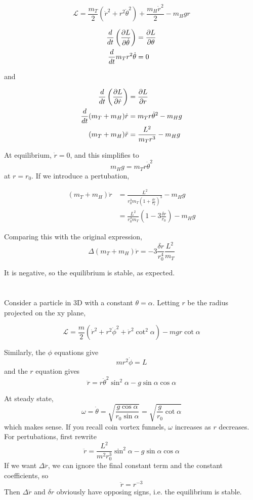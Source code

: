 \documentclass[12pt]{article}
\begin{document}
$$\mathcal L = \frac{m_T}{2}(\dot r^2 + r^2\dot\theta^2) + \frac{m_H\dot r^2}{2} - m_Hgr$$

\begin{align*}
    \frac{d}{dt}\left(\frac{\partial L}{\partial \dot\theta}\right) &= \frac{\partial L}{\partial \theta} \\
    \frac{d}{dt} m_Tr^2\dot\theta &= 0
\end{align*}

and

\begin{align*}
    \frac{d}{dt}\left(\frac{\partial L}{\partial \dot r}\right) &= \frac{\partial L}{\partial r} \\
    \frac{d}{dt} (m_T + m_H)\dot r &= m_Tr\dot\theta^2 - m_Hg \\
    (m_T + m_H)\ddot r &= \frac{L^2}{m_Tr^3} - m_Hg
\end{align*}

At equilibrium, $\dot r = 0$, and this simplifies to
$$m_Hg = m_Tr\dot\theta^2$$
at $r = r_0$. If we introduce a pertubation,

\begin{align*}
    (m_T + m_H)\ddot r &= \frac{L^2}{r_0^3m_T\left(1 + \frac{\delta r}{r_0}\right)^3} - m_Hg \\
                       &= \frac{L^2}{r_0^3m_T} \left(1 - 3\frac{\delta r}{r_0}\right) - m_Hg
\end{align*}

Comparing this with the original expression,
$$\Delta (m_T + m_H)\ddot r = -3\frac{\delta r}{r_0^4}\frac{L^2}{m_T}$$

It is negative, so the equilibrium is stable, as expected.

\section{}

Consider a particle in 3D with a constant $\theta = \alpha$. Letting $r$ be the radius projected on the xy plane,

$$\mathcal L = \frac{m}{2}(\dot r^2 + r^2\dot\phi^2 + \dot r^2\cot^2\alpha) - mgr\cot\alpha$$

Similarly, the $\phi$ equations give
$$mr^2\dot\phi = L$$
and the $r$ equation gives
$$\ddot r = r\dot\theta^2\sin^2\alpha - g\sin\alpha\cos\alpha$$

At steady state,
$$\omega = \dot\theta = \sqrt{\frac{g\cos\alpha}{r_0\sin\alpha}} = \sqrt{\frac{g}{r_0}\cot\alpha}$$
which makes sense. If you recall coin vortex funnels, $\omega$ increases as $r$ decreases. \\
For pertubations, first rewrite
$$\ddot r = \frac{L^2}{m^2r_0^3}\sin^2\alpha - g\sin\alpha\cos\alpha$$
If we want $\Delta \ddot r$, we can ignore the final constant term and the constant coefficients, so
$$\ddot r = r^{-3}$$
Then $\Delta\ddot r$ and $\delta r$ obviously have opposing signs, i.e. the equilibrium is stable.
\end{document}

